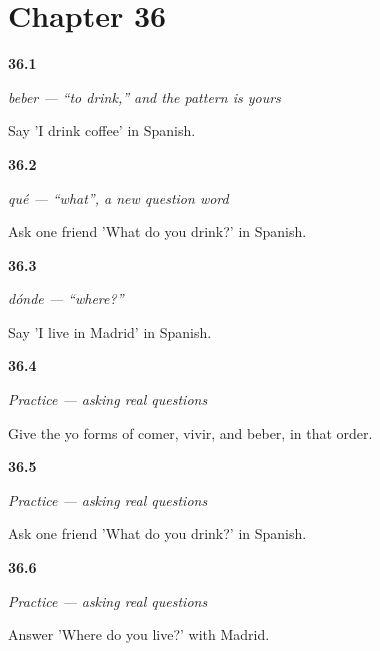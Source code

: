 \section*{Chapter 36}

\noindent\begin{minipage}[t]{\linewidth}
\raggedright
\hypertarget{review-ES-C07-beber-coffee}{\textbf{36.1}} \emph{beber — \textquotedblleft{}to drink,\textquotedblright{} and the pattern is yours}\par
\small Say 'I drink coffee' in Spanish.
\end{minipage}\par\medskip

\noindent\begin{minipage}[t]{\linewidth}
\raggedright
\hypertarget{review-ES-C07-que-ask-drinking}{\textbf{36.2}} \emph{qué — \textquotedblleft{}what\textquotedblright{}, a new question word}\par
\small Ask one friend 'What do you drink?' in Spanish.
\end{minipage}\par\medskip

\noindent\begin{minipage}[t]{\linewidth}
\raggedright
\hypertarget{review-ES-C07-donde-live-in-madrid}{\textbf{36.3}} \emph{dónde — \textquotedblleft{}where?\textquotedblright{}}\par
\small Say 'I live in Madrid' in Spanish.
\end{minipage}\par\medskip

\noindent\begin{minipage}[t]{\linewidth}
\raggedright
\hypertarget{review-ES-C07-practice-yo-forms}{\textbf{36.4}} \emph{Practice — asking real questions}\par
\small Give the yo forms of comer, vivir, and beber, in that order.
\end{minipage}\par\medskip

\noindent\begin{minipage}[t]{\linewidth}
\raggedright
\hypertarget{review-ES-C07-practice-ask-what}{\textbf{36.5}} \emph{Practice — asking real questions}\par
\small Ask one friend 'What do you drink?' in Spanish.
\end{minipage}\par\medskip

\noindent\begin{minipage}[t]{\linewidth}
\raggedright
\hypertarget{review-ES-C07-practice-live-in-madrid}{\textbf{36.6}} \emph{Practice — asking real questions}\par
\small Answer 'Where do you live?' with Madrid.
\end{minipage}\par\medskip

